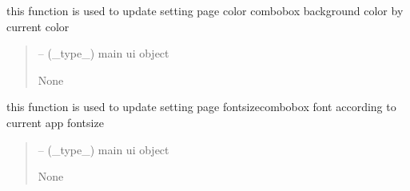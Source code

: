 \documentclass[letterpaper,10pt,english]{sphinxmanual}
\begin{document}
\begin{savenotes}\begin{fulllineitems}
\label{\detokenize{setting/backend/mainsetting_funcs:oxin.backend.mainsetting_funcs.update_combo_color}}
\pysigstartsignatures
{}
\pysigstopsignatures
\sphinxAtStartPar
this function is used to update setting page color combobox background color by current color
\begin{quote}\begin{description}
\sphinxAtStartPar
{} – (\_type\_) main ui object

\sphinxAtStartPar
None

\end{description}\end{quote}

\end{fulllineitems}\end{savenotes}


\begin{savenotes}\begin{fulllineitems}
\label{\detokenize{setting/backend/mainsetting_funcs:oxin.backend.mainsetting_funcs.update_combo_fontsize}}
\pysigstartsignatures
{}
\pysigstopsignatures
\sphinxAtStartPar
this function is used to update setting page fontsize\sphinxhyphen{}combobox font according to current app fontsize
\begin{quote}\begin{description}
\sphinxAtStartPar
{} – (\_type\_) main ui object

\sphinxAtStartPar
None

\end{description}\end{quote}

\end{fulllineitems}\end{savenotes}
\end{document}
